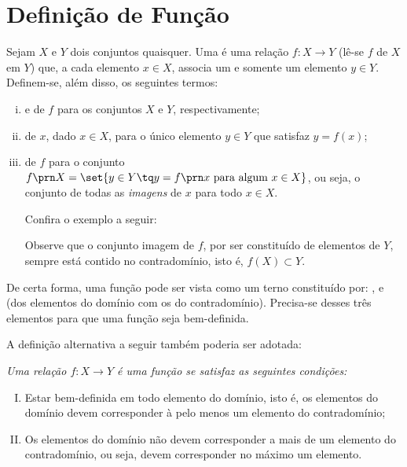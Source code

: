 \section{Definição de Função}

\begin{definition}
Sejam $X$ e $Y$ dois conjuntos quaisquer.
Uma  é uma relação $f: X \to Y$ (lê-se $f$ de $X$ em $Y$) que, a cada elemento $x \in X$, associa um e somente um elemento $y \in Y$.
Definem-se, além disso, os seguintes termos:
%
\begin{enumerate}[(i)]
\item {} e  de $f$ para os conjuntos $X$ e $Y$, respectivamente;
\item {} de $x$, dado $x \in X$, para o único elemento $y \in Y$ que satisfaz $y = f(x)$;
\item {} de $f$ para o conjunto $f\prn X = \set{y \in Y \tq y = f \prn x \text{ para algum } x \in X }$, ou seja, o conjunto de todas as \emph{imagens} de $x$ para todo $x \in X$.

Confira o exemplo a seguir:
\begin{center}
    
\end{center}
Observe que o conjunto imagem de $f$, por ser constituído de elementos de $Y$, sempre está contido no contradomínio, isto é, $f(X) \subset Y$.
\end{enumerate}
\end{definition}

De certa forma, uma função pode ser vista como um terno constituído por: ,  e  (dos elementos do domínio com os do contradomínio). 
Precisa-se desses três elementos para que uma função seja bem-definida. 

A definição alternativa a seguir também poderia ser adotada:
{\it \label{def:funcao-alternativa} Uma relação $f: X \to Y$ é uma \emph {função} se satisfaz as seguintes condições:
%
\begin{enumerate}[(I)]
  \item Estar bem-definida em todo elemento do domínio, isto é, os elementos do domínio devem corresponder à pelo menos um elemento do contradomínio;
  \item Os elementos do domínio não devem corresponder a mais de um elemento do contradomínio, ou seja, devem corresponder no máximo um elemento.
\end{enumerate}}


